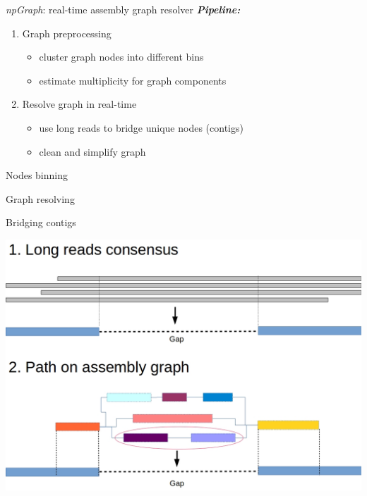 \documentclass{beamer}
\begin{document}
\begin{frame}{\emph{npGraph}: real-time assembly graph resolver}
\emph{\textbf{Pipeline:}}
\begin{enumerate}
  \item Graph preprocessing
  \begin{itemize}
    \item cluster graph nodes into different bins
    \item estimate multiplicity for graph components
  \end{itemize}
  \item Resolve graph in real-time
  \begin{itemize}
  	\item use long reads to bridge unique nodes (contigs)
  	\item clean and simplify graph
  \end{itemize}
\end{enumerate}
\end{frame}
\begin{frame}{Nodes binning}

\end{frame}
\begin{frame}{Graph resolving}

\end{frame}
\begin{frame}{Bridging contigs}
\begin{center}
 \includegraphics[height=.8\textheight]{gapfilling.jpg}  
\end{center}
\end{frame}
\end{document}

